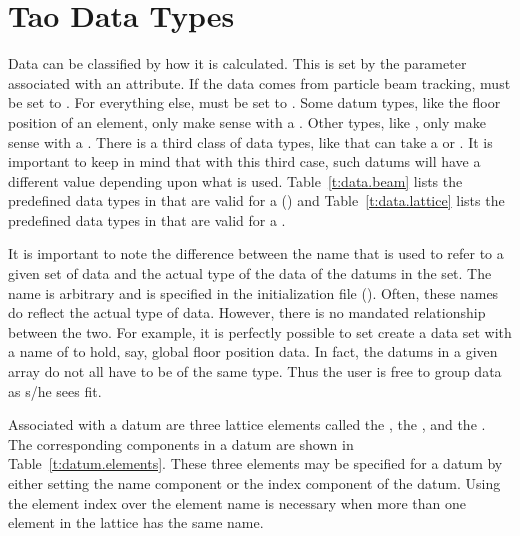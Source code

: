 \section{Tao Data Types}
\label{s:data.types}

Data can be classified by how it is calculated. This is set by the
 parameter associated with an attribute. If the data
comes from particle beam tracking,  must be set to
. For everything else,  must be set to
. Some datum types, like the floor position of an
element, only make sense with a  . Other
types, like , only make sense with a 
. There is a third class of data types, like
 that can take a  or 
. It is important to keep in mind that with this third
case, such datums will have a different value depending upon what
 is used.  Table~\ref{t:data.beam} lists the
predefined data types in \tao that are valid for a 
 () and
Table~\ref{t:data.lattice} lists the predefined data types in
\tao that are valid for a  .

It is important to note the difference between the  name
that is used to refer to a given set of data and the actual type of
the data of the datums in the set. The  name is arbitrary
and is specified in the \tao initialization file
(). Often, these names do reflect the actual type of
data. However, there is no mandated relationship between the two. For example,
it is perfectly possible to set create a data set with a 
name of  to hold, say, global floor position data. In
fact, the datums in a given  array do not all have to be of the
same type. Thus the user is free to group data as s/he sees fit.

Associated with a datum are three lattice elements called the
, the , and the
. The corresponding components in a datum are
shown in Table~\ref{t:datum.elements}.
These three elements may be specified for a datum by either setting
the name component or the index component of the datum. Using the
element index over the element name is necessary when more than one
element in the lattice has the same name.

